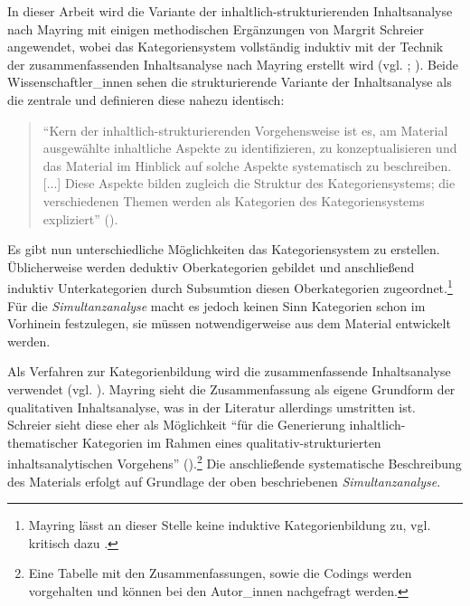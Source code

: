 \documentclass[12pt, titlepage=true, toc=bib]{scrartcl}
\begin{document}
{In dieser Arbeit wird die Variante der inhaltlich-strukturierenden Inhaltsanalyse nach Mayring mit einigen methodischen Ergänzungen von Margrit Schreier angewendet, wobei das Kategoriensystem vollständig induktiv mit der Technik der zusammenfassenden Inhaltsanalyse nach Mayring erstellt wird (vgl. \cite{mayring_qualitative_2010}; \cite{schreier_varianten_2014}). Beide Wissenschaftler\_innen sehen die strukturierende Variante der Inhaltsanalyse als die zentrale und definieren diese nahezu identisch:

\begin{singlespace*}
\begin{quote}
"`Kern der inhaltlich-strukturierenden Vorgehensweise ist es, am Material ausgewählte inhaltliche Aspekte zu identifizieren, zu konzeptualisieren und das Material im Hinblick auf solche Aspekte systematisch zu beschreiben. [...] Diese Aspekte bilden zugleich die Struktur des Kategoriensystems; die verschiedenen Themen werden als Kategorien des Kategoriensystems expliziert"' (\cite[5]{schreier_varianten_2014}).
\end{quote}
\end{singlespace*}

\noindent Es gibt nun unterschiedliche Möglichkeiten das Kategoriensystem zu erstellen. Üblicherweise werden deduktiv Oberkategorien gebildet und anschließend induktiv Unterkategorien durch Subsumtion diesen Oberkategorien zugeordnet.\footnote{Mayring lässt an dieser Stelle keine induktive Kategorienbildung zu, vgl. kritisch dazu \textcite[Kap. II.4]{steigleder_strukturierende_2008}.} Für die \textit{Simultanzanalyse} macht es jedoch keinen Sinn Kategorien schon im Vorhinein festzulegen, sie müssen notwendigerweise aus dem Material entwickelt werden. 

Als Verfahren zur Kategorienbildung wird die zusammenfassende Inhaltsanalyse verwendet (vgl. \cite[Kap. 5.5.2]{mayring_qualitative_2010}). Mayring sieht die Zusammenfassung als eigene Grundform der qualitativen Inhaltsanalyse, was in der Literatur allerdings umstritten ist. Schreier sieht diese eher als Möglichkeit "`für die Generierung inhaltlich-thematischer Kategorien im Rahmen eines qualitativ-strukturierten inhaltsanalytischen Vorgehens"' (\cite[14]{schreier_varianten_2014}).\footnote{Eine Tabelle mit den Zusammenfassungen, sowie die Codings werden vorgehalten und können bei den Autor\_innen nachgefragt werden.} Die anschließende systematische Beschreibung des Materials erfolgt auf Grundlage der oben beschriebenen \textit{Simultanzanalyse}.

}
\end{document}
